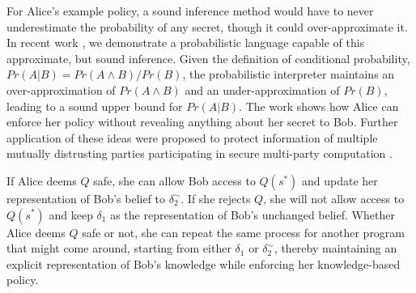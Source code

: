 \documentclass{article} %
\newcommand{\pxm}[1]{\textcolor{red}{PM -- #1}}
\newcommand{\asecret}[0]{s}
\newcommand{\rsecret}[0]{\asecret^*}
\newcommand{\sconst}[1]{\ensuremath{\mathsf{#1}}}
\newcommand{\strue}{\sconst{True}}
\newcommand{\sfalse}{\sconst{False}}
\newcommand{\paren}[1]{\left( #1 \right)}
\newcommand{\acond}[0]{|^\sim}
\newcommand{\stacklabel}[1]{\stackrel{\smash{\scriptscriptstyle \mathrm{#1}}}}
\newcommand{\defeq}{\stacklabel{def}=}
\theoremstyle{plain} %
\theoremstyle{definition} %
\begin{document}
For Alice's example policy, a sound inference method would have to
never underestimate the probability of any secret, though it could
over-approximate it. In recent work \cite{mardziel11belief}, we
demonstrate a probabilistic language capable of this approximate, but
sound inference. Given the definition of conditional probability, $
Pr(A | B) = Pr(A \wedge B) / Pr(B) $, the probabilistic interpreter
maintains an over-approximation of $ Pr(A \wedge B) $ and an
under-approximation of $ Pr(B) $, leading to a sound upper bound for $
Pr(A | B) $. The work shows how Alice can enforce her policy
without revealing anything about her secret to Bob. Further application
of these ideas were proposed to protect information of multiple
mutually distrusting parties participating in secure multi-party
computation \cite{mardziel12smc}.

%
%

%

If Alice deems $ Q $ safe, she can allow Bob access to $ Q(\rsecret) $
and update her representation of Bob's belief to $ \delta_2^\sim $. If
she rejects $ Q $, she will not allow access to $ Q(\rsecret) $ and
keep $ \delta_1 $ as the representation of Bob's unchanged
belief. Whether Alice deems $ Q $ safe or not, she can repeat the same
process for another program that might come around, starting from
either $ \delta_1 $ or $ \delta_2^\sim $, thereby maintaining an
explicit representation of Bob's knowledge while enforcing her
knowledge-based policy.
\end{document}
